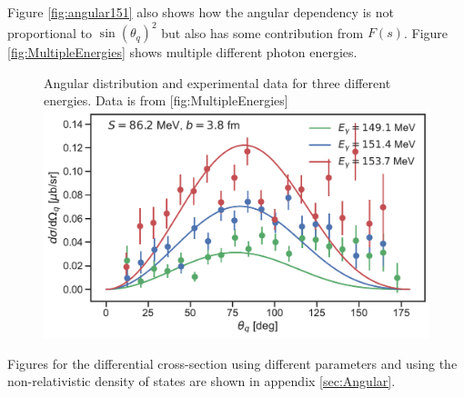 Figure \ref{fig:angular151} also shows how the angular dependency is not proportional to $\sin(\theta_q)^2$ but also has some contribution from $F(s)$. Figure \ref{fig:MultipleEnergies} shows multiple different photon energies.
\begin{figure}[H]
	\begin{sidecaption}{Angular distribution and experimental data for three different energies. Data is from \cite{BeckPion}}[fig:MultipleEnergies]
		\includegraphics[width=\linewidth]{Figures/MultiDiffcross_rel.pdf}
	\end{sidecaption}
\end{figure}
Figures for the differential cross-section using different parameters and using the non-relativistic density of states are shown in appendix \ref{sec:Angular}.

